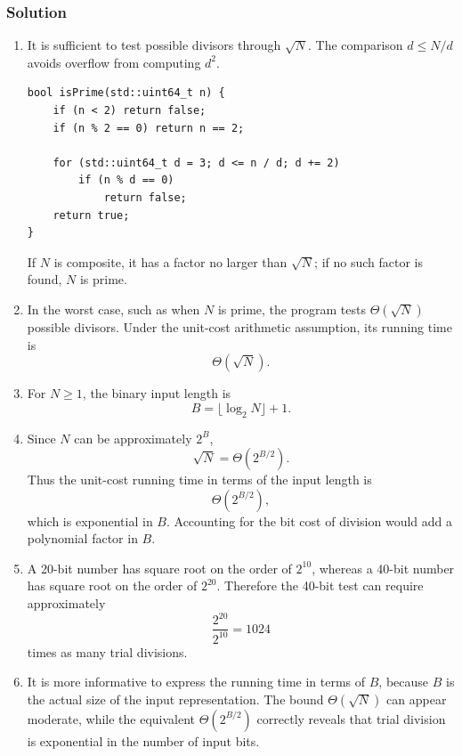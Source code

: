 \documentclass[12pt,a4paper]{article}
\begin{document}
\subsubsection*{\color{sectionnavy}Solution}

\begin{enumerate}
  \renewcommand{\labelenumi}{\alph{enumi}.}

  \item It is sufficient to test possible divisors through $\sqrt N$.
  The comparison $d\leq N/d$ avoids overflow from computing $d^2$.

\begin{lstlisting}
bool isPrime(std::uint64_t n) {
    if (n < 2) return false;
    if (n % 2 == 0) return n == 2;

    for (std::uint64_t d = 3; d <= n / d; d += 2)
        if (n % d == 0)
            return false;
    return true;
}
\end{lstlisting}

  If $N$ is composite, it has a factor no larger than $\sqrt N$; if no
  such factor is found, $N$ is prime.

  \item In the worst case, such as when $N$ is prime, the program tests
  $\Theta(\sqrt N)$ possible divisors. Under the unit-cost arithmetic
  assumption, its running time is
  \[
  \boxed{\Theta(\sqrt N)}.
  \]

  \item For $N\geq1$, the binary input length is
  \[
  \boxed{B=\lfloor\log_2N\rfloor+1}.
  \]

  \item Since $N$ can be approximately $2^B$,
  \[
  \sqrt N=\Theta(2^{B/2}).
  \]
  Thus the unit-cost running time in terms of the input length is
  \[
  \boxed{\Theta(2^{B/2})},
  \]
  which is exponential in $B$. Accounting for the bit cost of division
  would add a polynomial factor in $B$.

  \item A 20-bit number has square root on the order of $2^{10}$,
  whereas a 40-bit number has square root on the order of $2^{20}$.
  Therefore the 40-bit test can require approximately
  \[
  \frac{2^{20}}{2^{10}}=\boxed{1024}
  \]
  times as many trial divisions.

  \item It is more informative to express the running time in terms of
  $B$, because $B$ is the actual size of the input representation. The
  bound $\Theta(\sqrt N)$ can appear moderate, while the equivalent
  $\Theta(2^{B/2})$ correctly reveals that trial division is exponential
  in the number of input bits.
\end{enumerate}
\end{document}
